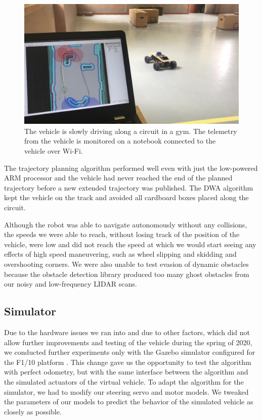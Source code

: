 \begin{figure}
	\centering
	\includegraphics[width=\textwidth]{../img/experiments/real-world-driving.jpg}
	\caption{The vehicle is slowly driving along a circuit in a gym. The telemetry from the vehicle is monitored on a notebook connected to the vehicle over Wi-Fi.}
	\label{fig:real-world-testing-driving}
\end{figure}

The trajectory planning algorithm performed well even with just the low-powered ARM processor and the vehicle had never reached the end of the planned trajectory before a new extended trajectory was published. The \gls{DWA} algorithm kept the vehicle on the track and avoided all cardboard boxes placed along the circuit.

Although the robot was able to navigate autonomously without any collisions, the speeds we were able to reach, without losing track of the position of the vehicle, were low and did not reach the speed at which we would start seeing any effects of high speed maneuvering, such as wheel slipping and skidding and overshooting corners. We were also unable to test evasion of dynamic obstacles because the obstacle detection library produced too many ghost obstacles from our noisy and low-frequency \gls*{LIDAR} scans.

\subsection{Simulator}
\label{sec:simulator}
Due to the hardware issues we ran into and due to other factors, which did not allow further improvements and testing of the vehicle during the spring of 2020, we conducted further experiments only with the Gazebo simulator \cite{gazebo} configured for the F1/10 platform \cite{varundev_ros_19}. This change gave us the opportunity to test the algorithm with perfect odometry, but with the same interface between the algorithm and the simulated actuators of the virtual vehicle. To adapt the algorithm for the simulator, we had to modify our steering servo and motor models. We tweaked the parameters of our models to predict the behavior of the simulated vehicle as closely as possible.

